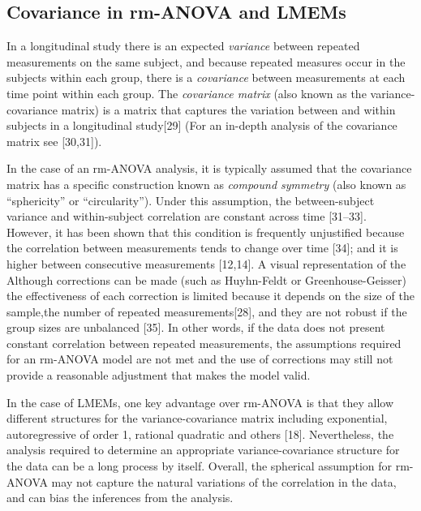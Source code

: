 \documentclass[
]{article}
\begin{document}
\hypertarget{covariance-in-rm-anova-and-lmems}{%
\subsection{Covariance in rm-ANOVA and LMEMs}\label{covariance-in-rm-anova-and-lmems}}

In a longitudinal study there is an expected \emph{variance} between repeated measurements on the same subject, and because repeated measures occur in the subjects within each group, there is a \emph{covariance} between measurements at each time point within each group. The \emph{covariance matrix} (also known as the variance-covariance matrix) is a matrix that captures the variation between and within subjects in a longitudinal study{[}29{]} (For an in-depth analysis of the covariance matrix see {[}30,31{]}).

In the case of an rm-ANOVA analysis, it is typically assumed that the covariance matrix has a specific construction known as \emph{compound symmetry} (also known as ``sphericity'' or ``circularity''). Under this assumption, the between-subject variance and within-subject correlation are constant across time {[}31--33{]}. However, it has been shown that this condition is frequently unjustified because the correlation between measurements tends to change over time {[}34{]}; and it is higher between consecutive measurements {[}12,14{]}. A visual representation of the
Although corrections can be made (such as Huyhn-Feldt or Greenhouse-Geisser) the effectiveness of each correction is limited because it depends on the size of the sample,the number of repeated measurements{[}28{]}, and they are not robust if the group sizes are unbalanced {[}35{]}. In other words, if the data does not present constant correlation between repeated measurements, the assumptions required for an rm-ANOVA model are not met and the use of corrections may still not provide a reasonable adjustment that makes the model valid.

In the case of LMEMs, one key advantage over rm-ANOVA is that they allow different structures for the variance-covariance matrix including exponential, autoregressive of order 1, rational quadratic and others {[}18{]}. Nevertheless, the analysis required to determine an appropriate variance-covariance structure for the data can be a long process by itself. Overall, the spherical assumption for rm-ANOVA may not capture the natural variations of the correlation in the data, and can bias the inferences from the analysis.
\end{document}
